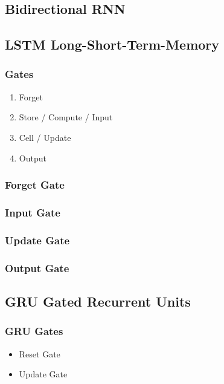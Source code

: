 \documentclass[a4paper, landscape, 10pt]{scrartcl}
\begin{document}
\begin{multicols*}{3}
        \subsection{Bidirectional RNN}

        \subsection{LSTM \tiny{Long-Short-Term-Memory}}


        \subsubsection{Gates}
        \begin{enumerate}
            \item Forget
            \item Store / Compute / Input
            \item Cell / Update
            \item Output
        \end{enumerate}

        \subsubsection{Forget Gate}
        \subsubsection{Input Gate}
        \subsubsection{Update Gate}
        \subsubsection{Output Gate}
        
        \subsection{GRU \tiny{Gated Recurrent Units}}
        \subsubsection{GRU Gates}
        \begin{itemize}
            \item Reset Gate
            \item Update Gate
        \end{itemize}


\end{multicols*}
\end{document}
